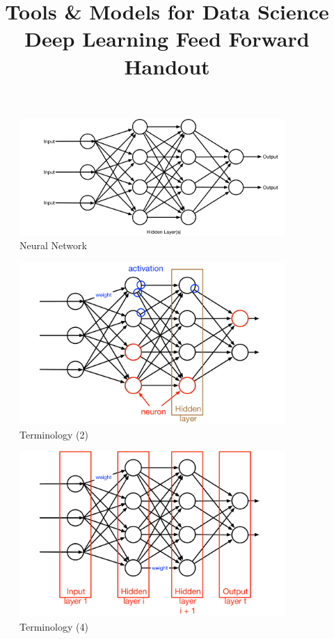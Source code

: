 \documentclass{article}
\title{Tools \& Models for Data Science \\ Deep Learning Feed Forward Handout}
\date{}
\begin{document}
\maketitle
\thispagestyle{fancy}

\begin{figure}[h]
\includegraphics[width=0.9\textwidth]{lectFF/nn.pdf}
\caption{Neural Network}
\end{figure}

\begin{figure}[h]
\includegraphics[width=0.9\textwidth]{lectFF/nnTerms.pdf}
\caption{Terminology (2)}
\end{figure}

\begin{figure}[h]
\includegraphics[width=0.9\textwidth]{lectFF/nnTerms2.pdf}
\caption{Terminology (4)}
\end{figure}
\end{document}
